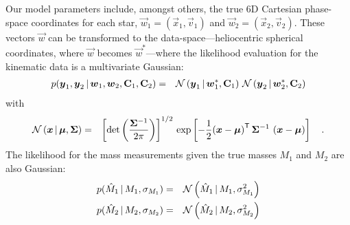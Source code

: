 \documentclass[12pt,letterpaper]{article}
\begin{document}
Our model parameters include, amongst others, the true 6D Cartesian phase-space
coordinates for each star, $\vec{w}_1=(\vec{x}_1, \vec{v}_1)$ and
$\vec{w}_2=(\vec{x}_2, \vec{v}_2)$.
These vectors $\vec{w}$ can be transformed to the data-space---heliocentric
spherical coordinates, where $\vec{w}$ becomes $\vec{w}^*$---where the
likelihood evaluation for the kinematic data is a multivariate Gaussian:
\begin{eqnarray}
    p(\boldsymbol{y}_1, \boldsymbol{y}_2 \,|\, \boldsymbol{w}_1, \boldsymbol{w}_2, \mathbf{C}_1, \mathbf{C}_2)
        &=&
        \mathcal{N}\left(\boldsymbol{y}_1 \,|\, \boldsymbol{w}_1^*, \mathbf{C}_1 \right) \,
        \mathcal{N}\left(\boldsymbol{y}_2 \,|\, \boldsymbol{w}_2^*, \mathbf{C}_2 \right)
\end{eqnarray}
with
\begin{eqnarray}
    \mathcal{N}\left(\boldsymbol{x} \,|\, \boldsymbol{\mu}, \mathbf{\Sigma}\right) &=&
        \left[\det\left(\frac{\mathbf{\Sigma}^{-1}}{2\pi}\right)\right]^{1/2} \,
          \exp \left[ -\frac{1}{2} {\left(\boldsymbol{x} - \boldsymbol{\mu} \right)}^{\mathsf{T}} \,
          \mathbf{\Sigma}^{-1} \,
          \left(\boldsymbol{x} - \boldsymbol{\mu} \right) \right] \quad .
\end{eqnarray}
The likelihood for the mass measurements given the true masses $M_1$ and $M_2$
are also Gaussian:
\begin{eqnarray}
    p(\hat{M}_1 \,|\, M_1, \sigma_{M_1}) &=&
        \mathcal{N}\left(\hat{M}_1 \,|\, M_1, \sigma_{M_1}^2\right) \\
    p(\hat{M}_2 \,|\, M_2, \sigma_{M_2}) &=&
        \mathcal{N}\left(\hat{M}_2 \,|\, M_2, \sigma_{M_2}^2\right)
\end{eqnarray}
\end{document}

